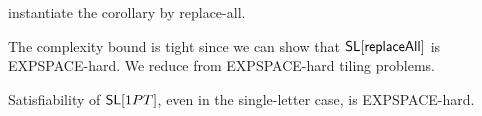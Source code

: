 \begin{remark}
	instantiate the corollary by replace-all. 
\end{remark}

The complexity bound is tight since we can show that $\mathsf{SL}[\mathsf{replaceAll}]$ is EXPSPACE-hard. We reduce from EXPSPACE-hard tiling problems.  

%


\begin{theorem}
	Satisfiability of $\mathsf{SL}[1PT]$, even in the single-letter case, is EXPSPACE-hard.
\end{theorem}


%
%
